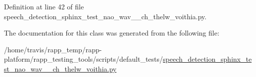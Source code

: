 Definition at line 42 of file speech\-\_\-detection\-\_\-sphinx\-\_\-test\-\_\-nao\-\_\-wav\-\_\-\_\-ch\-\_\-thelw\-\_\-voithia.\-py.



The documentation for this class was generated from the following file\-:\begin{DoxyCompactItemize}
\item 
/home/travis/rapp\-\_\-temp/rapp-\/platform/rapp\-\_\-testing\-\_\-tools/scripts/default\-\_\-tests/\hyperlink{speech__detection__sphinx__test__nao__wav__1__ch__thelw__voithia_8py}{speech\-\_\-detection\-\_\-sphinx\-\_\-test\-\_\-nao\-\_\-wav\-\_\-\_\-ch\-\_\-thelw\-\_\-voithia.\-py}\end{DoxyCompactItemize}
